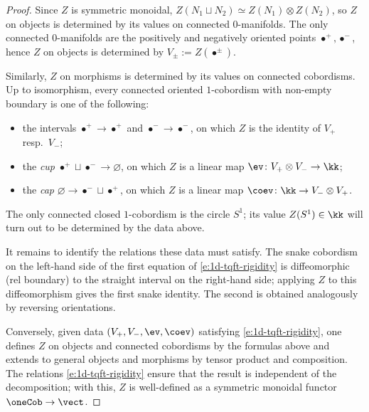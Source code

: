 \begin{proof}
  Since $Z$ is symmetric monoidal, $Z(N_1\sqcup N_2)\simeq Z(N_1)\otimes Z(N_2)$,
  so $Z$ on objects is determined by its values on connected 0-manifolds. The
  only connected 0-manifolds are the positively and negatively oriented points
  $\bullet^+, \bullet^-$, hence $Z$ on objects is determined by
  $V_\pm := Z(\bullet^\pm)$.

  Similarly, $Z$ on morphisms is determined by its values on connected
  cobordisms. Up to isomorphism, every connected oriented $1$-cobordism with
  non-empty boundary is one of the following:
  \begin{itemize}
    \item the intervals $\bullet^+\to\bullet^+$ and $\bullet^-\to\bullet^-$,
      on which $Z$ is the identity of $V_+$ resp.\ $V_-$;
    \item the \emph{cup}
      $\bullet^+\sqcup\bullet^-\to\varnothing$, on which $Z$ is a linear
      map $\ev\colon V_+\otimes V_-\to\kk$;
    \item the \emph{cap}
      $\varnothing\to\bullet^-\sqcup\bullet^+$, on which $Z$ is a linear
      map $\coev\colon \kk\to V_-\otimes V_+$.
  \end{itemize}
  The only connected closed $1$-cobordism is the circle $S^1$; its value
  $Z(S^1)\in\kk$ will turn out to be determined by the data above.

  It remains to identify the relations these data must satisfy. The snake
  cobordism on the left-hand side of the first equation of
  \eqref{e:1d-tqft-rigidity} is diffeomorphic (rel boundary) to the straight
  interval on the right-hand side; applying $Z$ to this diffeomorphism gives
  the first snake identity. The second is obtained analogously by reversing
  orientations.

  Conversely, given data $(V_+, V_-, \ev, \coev)$ satisfying
  \eqref{e:1d-tqft-rigidity}, one defines $Z$ on objects and connected
  cobordisms by the formulas above and extends to general objects and
  morphisms by tensor product and composition. The relations
  \eqref{e:1d-tqft-rigidity} ensure that the result is independent of the
  decomposition; with this, $Z$ is well-defined as a symmetric monoidal
  functor $\oneCob\to\vect$.
\end{proof}

